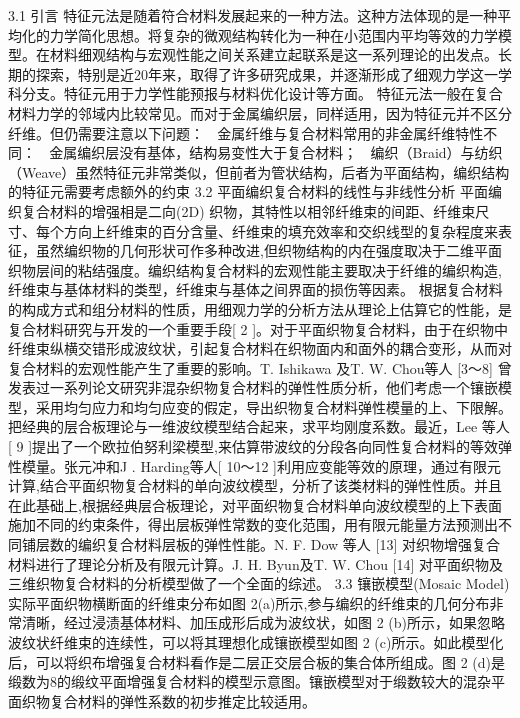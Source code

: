 3.1  引言
特征元法是随着符合材料发展起来的一种方法。这种方法体现的是一种平均化的力学简化思想。将复杂的微观结构转化为一种在小范围内平均等效的力学模型。在材料细观结构与宏观性能之间关系建立起联系是这一系列理论的出发点。长期的探索，特别是近20年来，取得了许多研究成果，并逐渐形成了细观力学这一学科分支。特征元用于力学性能预报与材料优化设计等方面。
特征元法一般在复合材料力学的邻域内比较常见。而对于金属编织层，同样适用，因为特征元并不区分纤维。但仍需要注意以下问题：
	金属纤维与复合材料常用的非金属纤维特性不同：
	金属编织层没有基体，结构易变性大于复合材料；
	编织（Braid）与纺织（Weave）虽然特征元非常类似，但前者为管状结构，后者为平面结构，编织结构的特征元需要考虑额外的约束
3.2  平面编织复合材料的线性与非线性分析
平面编织复合材料的增强相是二向(2D) 织物，其特性以相邻纤维束的间距、纤维束尺寸、每个方向上纤维束的百分含量、纤维束的填充效率和交织线型的复杂程度来表征，虽然编织物的几何形状可作多种改进,但织物结构的内在强度取决于二维平面织物层间的粘结强度。编织结构复合材料的宏观性能主要取决于纤维的编织构造,纤维束与基体材料的类型，纤维束与基体之间界面的损伤等因素。
根据复合材料的构成方式和组分材料的性质，用细观力学的分析方法从理论上估算它的性能，是复合材料研究与开发的一个重要手段[ 2 ]。对于平面织物复合材料，由于在织物中纤维束纵横交错形成波纹状，引起复合材料在织物面内和面外的耦合变形，从而对复合材料的宏观性能产生了重要的影响。T. Ishikawa 及T. W. Chou等人 [3～8] 曾发表过一系列论文研究非混杂织物复合材料的弹性性质分析，他们考虑一个镶嵌模型，采用均匀应力和均匀应变的假定，导出织物复合材料弹性模量的上、下限解。把经典的层合板理论与一维波纹模型结合起来，求平均刚度系数。最近，Lee 等人[ 9 ]提出了一个欧拉伯努利梁模型,来估算带波纹的分段各向同性复合材料的等效弹性模量。张元冲和J . Harding等人[ 10～12 ]利用应变能等效的原理，通过有限元计算,结合平面织物复合材料的单向波纹模型，分析了该类材料的弹性性质。并且在此基础上,根据经典层合板理论，对平面织物复合材料单向波纹模型的上下表面施加不同的约束条件，得出层板弹性常数的变化范围，用有限元能量方法预测出不同铺层数的编织复合材料层板的弹性性能。N. F. Dow 等人 [13] 对织物增强复合材料进行了理论分析及有限元计算。J. H. Byun及T. W. Chou [14] 对平面织物及三维织物复合材料的分析模型做了一个全面的综述。
3.3  镶嵌模型(Mosaic Model)
实际平面织物横断面的纤维束分布如图 2(a)所示,参与编织的纤维束的几何分布非常清晰，经过浸渍基体材料、加压成形后成为波纹状，如图 2 (b)所示，如果忽略波纹状纤维束的连续性，可以将其理想化成镶嵌模型如图 2 (c)所示。如此模型化后，可以将织布增强复合材料看作是二层正交层合板的集合体所组成。图 2 (d)是缎数为8的缎纹平面增强复合材料的模型示意图。镶嵌模型对于缎数较大的混杂平面织物复合材料的弹性系数的初步推定比较适用。
 
